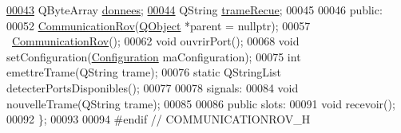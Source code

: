 \begin{DoxyCode}
\hyperlink{class_communication_rov_acbb6939bb597179956c6f4bc5ca39f3f}{00043}     QByteArray \hyperlink{class_communication_rov_acbb6939bb597179956c6f4bc5ca39f3f}{donnees};                 
\hyperlink{class_communication_rov_a2f5a49875a9fa51800522c531ecc65fc}{00044}     QString \hyperlink{class_communication_rov_a2f5a49875a9fa51800522c531ecc65fc}{trameRecue};                 
00045 
00046 \textcolor{keyword}{public}:
00052     \hyperlink{class_communication_rov}{CommunicationRov}(\hyperlink{class_q_object}{QObject} *parent = \textcolor{keyword}{nullptr});
00057     ~\hyperlink{class_communication_rov}{CommunicationRov}();
00062     \textcolor{keywordtype}{void} ouvrirPort();
00068     \textcolor{keywordtype}{void} setConfiguration(\hyperlink{struct_configuration}{Configuration} maConfiguration);
00075     \textcolor{keywordtype}{int} emettreTrame(QString trame);
00076     \textcolor{keyword}{static} QStringList detecterPortsDisponibles();
00077 
00078 signals:
00084     \textcolor{keywordtype}{void} nouvelleTrame(QString trame);
00085 
00086 \textcolor{keyword}{public} slots:
00091     \textcolor{keywordtype}{void} recevoir();
00092 \};
00093 
00094 \textcolor{preprocessor}{#endif // COMMUNICATIONROV\_H}
\end{DoxyCode}
